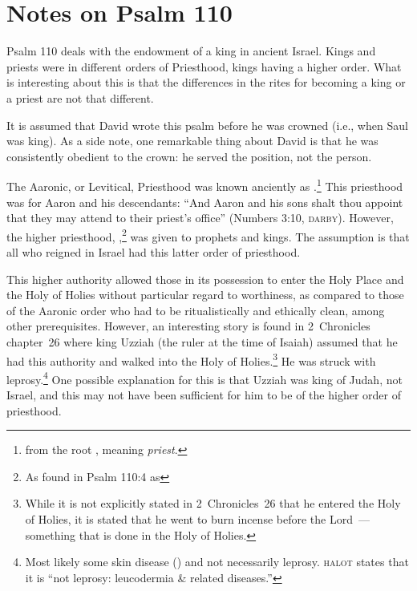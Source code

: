 \section{Notes on Psalm 110}\label{app:psalm-110}\thispagestyle{fancy}
Psalm 110 deals with the endowment of a king in ancient Israel. Kings and priests were in different orders of Priesthood, kings having a higher order. What is interesting about this is that the differences in the rites for becoming a king or a priest are not that different.

It is assumed that David wrote this psalm before he was crowned (i.e., when Saul was king). As a side note, one remarkable thing about David is that he was consistently obedient to the crown: he served the position, not the person.

The Aaronic, or Levitical, Priesthood was known anciently as .\footnote{from the root , meaning \emph{priest}.} This priesthood was for Aaron and his descendants: ``And Aaron and his sons shalt thou appoint that they may attend to their priest's office'' (Numbers 3:10, \textsc{darby}). However, the higher priesthood, ,\footnote{As found in Psalm 110:4 as } was given to prophets and kings. The assumption is that all who reigned in Israel had this latter order of priesthood.

This higher authority allowed those in its possession to enter the Holy Place and the Holy of Holies without particular regard to worthiness, as compared to those of the Aaronic order who had to be ritualistically and ethically clean, among other prerequisites. However, an interesting story is found in 2~Chronicles chapter~26 where king Uzziah (the ruler at the time of Isaiah) assumed that he had this authority and walked into the Holy of Holies.\footnote{While it is not explicitly stated in 2~Chronicles~26 that he entered the Holy of Holies, it is stated that he went to burn incense before the Lord~--- something that is done in the Holy of Holies.} He was struck with leprosy.\footnote{Most likely some skin disease () and not necessarily leprosy. \textsc{halot} states that it is ``not leprosy: leucodermia \& related diseases.''} One possible explanation for this is that Uzziah was king of Judah, not Israel, and this may not have been sufficient for him to be of the higher order of priesthood.
